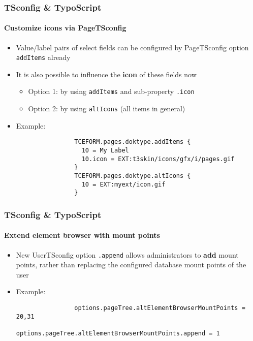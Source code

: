 \begin{frame}[fragile]
	\frametitle{TSconfig \& TypoScript}
	\framesubtitle{Customize icons via PageTSconfig}

	\begin{itemize}
		\item Value/label pairs of select fields can be configured by PageTSconfig option \texttt{addItems} already
		\item It is also possible to influence the \textbf{icon} of these fields now

			\begin{itemize}
				\item Option 1: by using \texttt{addItems} and sub-property \texttt{.icon}
				\item Option 2: by using \texttt{altIcons} (all items in general)
			\end{itemize}

		\item Example:

			\begin{lstlisting}
				TCEFORM.pages.doktype.addItems {
				  10 = My Label
				  10.icon = EXT:t3skin/icons/gfx/i/pages.gif
				}
				TCEFORM.pages.doktype.altIcons {
				  10 = EXT:myext/icon.gif
				}
			\end{lstlisting}

	\end{itemize}

\end{frame}


\begin{frame}[fragile]
	\frametitle{TSconfig \& TypoScript}
	\framesubtitle{Extend element browser with mount points}

	\begin{itemize}
		\item New UserTSconfig option \texttt{.append} allows administrators to \textbf{add}
			mount points, rather than replacing the configured database mount points of the user

		\item Example:

			\begin{lstlisting}
				options.pageTree.altElementBrowserMountPoints = 20,31
				options.pageTree.altElementBrowserMountPoints.append = 1
			\end{lstlisting}

	\end{itemize}

\end{frame}

